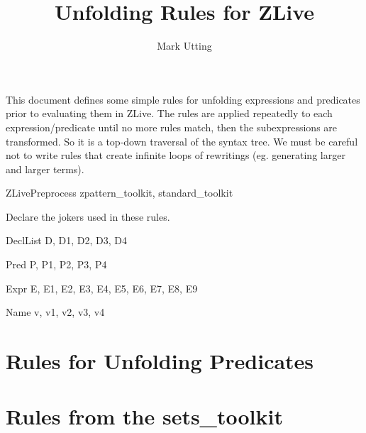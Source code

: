 \documentclass{article}
\title{Unfolding Rules for ZLive}
\author{Mark Utting}
\begin{document}
\maketitle

This document defines some simple rules for unfolding expressions 
and predicates prior to evaluating them in ZLive.  The rules are
applied repeatedly to each expression/predicate until no more rules
match, then the subexpressions are transformed.  So it is a top-down
traversal of the syntax tree.  We must be careful not to write rules
that create infinite loops of rewritings (eg. generating larger and
larger terms).


\begin{zsection}
  \SECTION ZLivePreprocess \parents zpattern\_toolkit, standard\_toolkit
\end{zsection}

Declare the jokers used in these rules.

\begin{zedjoker}{DeclList} D, D1, D2, D3, D4 \end{zedjoker}
\begin{zedjoker}{Pred} P, P1, P2, P3, P4 \end{zedjoker}
\begin{zedjoker}{Expr} E, E1, E2, E3, E4, E5, E6, E7, E8, E9 \end{zedjoker}
\begin{zedjoker}{Name} v, v1, v2, v3, v4 \end{zedjoker}



\section{Rules for Unfolding Predicates}




\section{Rules from the sets\_toolkit}
\end{document}

